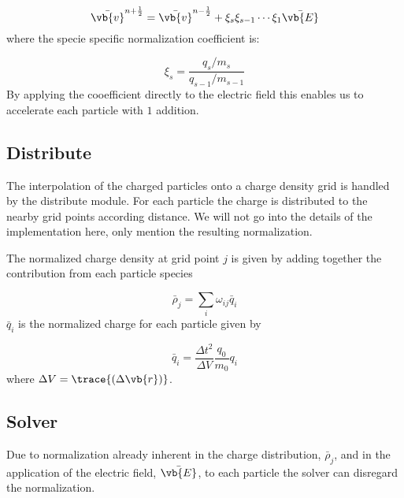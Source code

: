             \begin{equation}
                \bar{\vb{v}}^{n+\frac{1}{2}} =  \bar{\vb{v}}^{n-\frac{1}{2}} + \xi_s\xi_{s-1}\cdots \xi_1\bar{\vb{E}}
            \end{equation}
            where the specie specific normalization coefficient is:

            \begin{equation}
                \xi_s = \frac{q_s/m_s}{q_{s-1}/m_{s-1}}
            \end{equation}
%
            By applying the cooefficient directly to the electric field
            this enables us to accelerate each particle with \(1\) addition.

        \subsection{Distribute}
            The interpolation of the charged particles onto a charge density grid
            is handled by the distribute module. For each particle the charge is distributed
            to the nearby grid points according distance. We will not go into the details of
            the implementation here, only mention the resulting normalization.

            The normalized charge density at grid point \(j\) is given by adding together
            the contribution from each particle species

            \begin{equation}
                \bar{\rho}_j = \sum_i \omega_{ij} \bar{q}_i
            \end{equation}
            \(\bar{q}_i\) is the normalized charge for each particle given by

            \begin{equation}
                \bar{q}_i = \frac{\Delta t^2}{\Delta V} \frac{q_0}{m_0} q_i
            \end{equation}
            where \(\Delta V = \trace{(\Delta \vb{r})}\).

        \subsection{Solver}
            Due to normalization already inherent in the charge distribution, \(\bar{\rho}_j\),  and
            in the application of the electric field, \(\bar{\vb{E}}\), to each particle the
            solver can disregard the normalization.
